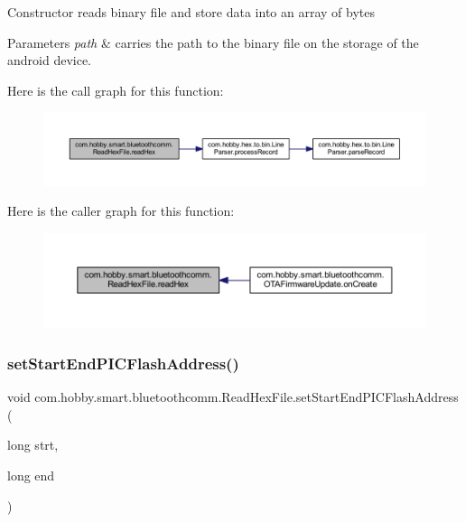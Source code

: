 Constructor reads binary file and store data into an array of bytes 
\begin{DoxyParams}{Parameters}
{\em path} & carries the path to the binary file on the storage of the android device. \\
\hline
\end{DoxyParams}
Here is the call graph for this function\+:\nopagebreak
\begin{figure}[H]
\begin{center}
\leavevmode
\includegraphics[width=350pt]{classcom_1_1hobby_1_1smart_1_1bluetoothcomm_1_1_read_hex_file_ac2a312201c1ad96d3c8493c438558774_cgraph}
\end{center}
\end{figure}
Here is the caller graph for this function\+:\nopagebreak
\begin{figure}[H]
\begin{center}
\leavevmode
\includegraphics[width=350pt]{classcom_1_1hobby_1_1smart_1_1bluetoothcomm_1_1_read_hex_file_ac2a312201c1ad96d3c8493c438558774_icgraph}
\end{center}
\end{figure}
\mbox{\label{classcom_1_1hobby_1_1smart_1_1bluetoothcomm_1_1_read_hex_file_a9c15e4c86ee8bab1c493cc91f42ce1fc}} 
\subsubsection{\texorpdfstring{set\+Start\+End\+P\+I\+C\+Flash\+Address()}{setStartEndPICFlashAddress()}}
{\footnotesize\ttfamily void com.\+hobby.\+smart.\+bluetoothcomm.\+Read\+Hex\+File.\+set\+Start\+End\+P\+I\+C\+Flash\+Address (\begin{DoxyParamCaption}\item[{long}]{strt,  }\item[{long}]{end }\end{DoxyParamCaption})}

